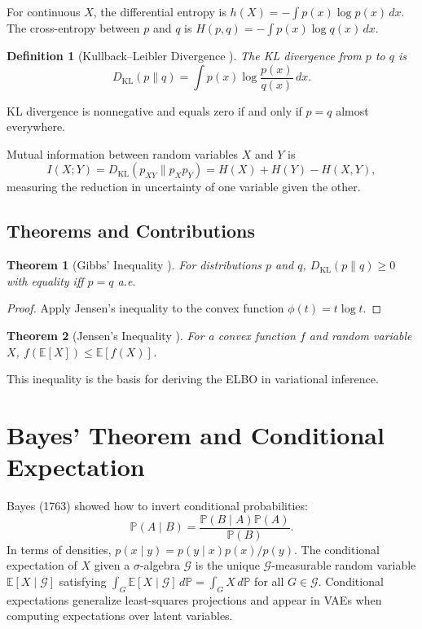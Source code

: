 \documentclass[11pt]{book}
\newtheorem{theorem}{Theorem}[chapter]
\newtheorem{definition}{Definition}[chapter]
\begin{document}
For continuous $X$, the differential entropy is $h(X)=-\int p(x)\log p(x)\,dx$. The cross-entropy between $p$ and $q$ is $H(p,q)=-\int p(x)\log q(x)\,dx$.

\begin{definition}[Kullback--Leibler Divergence \cite{kullback1951}]
The KL divergence from $p$ to $q$ is
\begin{equation}
D_{\mathrm{KL}}(p\|q) = \int p(x) \log \frac{p(x)}{q(x)}\, dx.
\end{equation}
\end{definition}
KL divergence is nonnegative and equals zero if and only if $p=q$ almost everywhere.

Mutual information between random variables $X$ and $Y$ is
\begin{equation}
I(X;Y)=D_{\mathrm{KL}}(p_{XY}\|p_X p_Y)=H(X)+H(Y)-H(X,Y),
\end{equation}
measuring the reduction in uncertainty of one variable given the other.

\subsection{Theorems and Contributions}
\begin{theorem}[Gibbs' Inequality \cite{gibbs1873,shannon1948}]
For distributions $p$ and $q$, $D_{\mathrm{KL}}(p\|q)\ge0$ with equality iff $p=q$ a.e.
\end{theorem}
\begin{proof}
Apply Jensen's inequality to the convex function $\phi(t)=t\log t$.
\end{proof}

\begin{theorem}[Jensen's Inequality \cite{jensen1906}]
For a convex function $f$ and random variable $X$, $f(\mathbb{E}[X])\le\mathbb{E}[f(X)]$.
\end{theorem}
This inequality is the basis for deriving the ELBO in variational inference.

\section{Bayes' Theorem and Conditional Expectation}
Bayes (1763) showed how to invert conditional probabilities:
\begin{equation}
\mathbb{P}(A\mid B)=\frac{\mathbb{P}(B\mid A)\mathbb{P}(A)}{\mathbb{P}(B)}.
\end{equation}
In terms of densities, $p(x\mid y)=p(y\mid x)p(x)/p(y)$. The conditional expectation of $X$ given a $\sigma$-algebra $\mathcal{G}$ is the unique $\mathcal{G}$-measurable random variable $\mathbb{E}[X\mid\mathcal{G}]$ satisfying $\int_G \mathbb{E}[X\mid\mathcal{G}]\, d\mathbb{P}=\int_G X\, d\mathbb{P}$ for all $G\in\mathcal{G}$. Conditional expectations generalize least-squares projections and appear in VAEs when computing expectations over latent variables.
\end{document}
